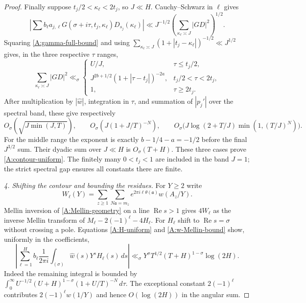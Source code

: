 \begin{proof}
Finally suppose $t_j/2<\kappa_\ell<2t_j$, so $J\ll H$.
Cauchy--Schwarz in $\ell$ gives
\[
 \left|\sum b_\ell a_{j,\ell}
       G(\sigma+i\tau,t_j,\kappa_\ell)D_{s_j}(\kappa_\ell)\right|
 \ll J^{-1/2}
       \left(\sum_{\kappa_\ell\asymp J}|GD|^2\right)^{1/2}.
\]
Squaring \eqref{A:gamma-full-bound} and using
$\sum_{\kappa_\ell\asymp J}(1+|t_j-\kappa_\ell|)^{-1/2}
\ll J^{1/2}$ gives, in the three respective $\tau$ ranges,
\[
 \sum_{\kappa_\ell\asymp J}|GD|^2\ll_\sigma
 \begin{cases}
 U/J,&\tau\leq t_j/2,\\
 J^{2b+1/2}(1+|\tau-t_j|)^{-2a},&t_j/2<\tau<2t_j,\\
 1,&\tau\geq2t_j.
 \end{cases}
\]
After multiplication by $|\widehat w|$, integration in $\tau$,
and summation of $|p_j'|$ over the spectral band, these give
respectively
\[
 O_\sigma(\sqrt{J\min(J,T)}),\qquad
 O_\sigma(J(1+J/T)^{-N}),\qquad
 O_\sigma\bigl(J\log(2+T/J)\min(1,(T/J)^N)\bigr).
\]
For the middle range the exponent is exactly
$b-1/4-a=-1/2$ before the final $J^{3/2}$ sum.
Their dyadic sum over $J\ll H$ is $O_\sigma(T+H)$.
These three cases prove \eqref{A:contour-uniform}. The finitely
many $0<t_j<1$ are included in the band $J=1$; the strict spectral
gap ensures all constants there are finite.

\emph{4. Shifting the contour and bounding the residues.}
For $Y\geq2$ write
\[
 W_\ell(Y)=\sum_{z\geq1}\sum_{N\mathfrak a=m_z}
 e^{2\pi i\ell\theta(\mathfrak a)}w(A_z/Y).
\]
Mellin inversion of \eqref{A:Mellin-geometry} on a line
$\operatorname{Re}s>1$ gives $4W_\ell$ as the inverse Mellin
transform of $M_\ell-2(-1)^\ell-4H_\ell$.
For $H_\ell$ shift to $\operatorname{Re}s=\sigma$ without
crossing a pole. Equations \eqref{A:H-uniform} and
\eqref{A:w-Mellin-bound} show, uniformly in the coefficients,
\begin{equation}\label{A:correction-inversion}
 \left|\sum_{\ell=1}^Hb_\ell\frac1{2\pi i}
 \int_{(\sigma)}\widehat w(s)Y^sH_\ell(s)\,ds\right|
 \ll_\sigma Y^\sigma
     T^{1/2}(T+H)^{1-\sigma}\log(2H).
\end{equation}
Indeed the remaining integral is bounded by
$\int_0^\infty U^{-1/2}(U+H)^{1-\sigma}(1+U/T)^{-N}\,d\tau$.
The exceptional constant $2(-1)^\ell$ contributes
$2(-1)^\ell w(1/Y)$ and hence $O(\log(2H))$ in the angular sum.


\end{proof}
